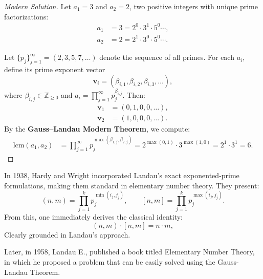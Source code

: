 \documentclass[11pt]{article}
\theoremstyle{plain}
\begin{document}
\begin{proof}[Modern Solution]
Let \( a_1 = 3 \) and \( a_2 = 2 \), two positive integers with unique prime factorizations:
\[
\begin{aligned}
a_1 &= 3 = 2^0 \cdot 3^1 \cdot 5^0 \cdots, \\
a_2 &= 2 = 2^1 \cdot 3^0 \cdot 5^0 \cdots.
\end{aligned}
\]

\noindent
Let \( \{p_j\}_{j=1}^\infty = (2, 3, 5, 7, \dots) \) denote the sequence of all primes. For each \( a_i \), define its prime exponent vector
\[
\mathbf{v}_i = (\beta_{i,1}, \beta_{i,2}, \beta_{i,3}, \dots),
\]
where \( \beta_{i,j} \in \mathbb{Z}_{\geq 0} \) and \( a_i = \prod_{j=1}^\infty p_j^{\beta_{i,j}} \). Then:
\[
\begin{aligned}
\mathbf{v}_1 &= (0, 1, 0, 0, \dots), \\
\mathbf{v}_2 &= (1, 0, 0, 0, \dots).
\end{aligned}
\]
\noindent
By the \textbf{Gauss--Landau Modern Theorem}, we compute:
\[
\begin{aligned}
\mathrm{lcm}(a_1, a_2) &= \prod_{j=1}^\infty p_j^{\max(\beta_{1,j}, \beta_{2,j})}
= 2^{\max(0,1)} \cdot 3^{\max(1,0)} = 2^1 \cdot 3^1 = 6.
\end{aligned}
\]
\end{proof}
\noindent
In 1938, Hardy and Wright \cite{Hardy1938} incorporated Landau’s exact exponented‑prime formulations, making them standard in elementary number theory. They present:
\[
(n, m) = \prod_{j=1}^{k} p_j^{\min(i_j, j_j)}, \qquad [n, m] = \prod_{j=1}^{k} p_j^{\max(i_j, j_j)}.
\]
From this, one immediately derives the classical identity:
\[(n, m) \cdot [n, m] = n \cdot m, \] 
Clearly grounded in Landau’s approach.

\vspace{2mm}
\noindent
Later, in 1958, Landau E., \cite{Landau1958} published a book titled Elementary Number Theory, in which he proposed a problem that can be easily solved using the Gauss-Landau Theorem.
\end{document}
